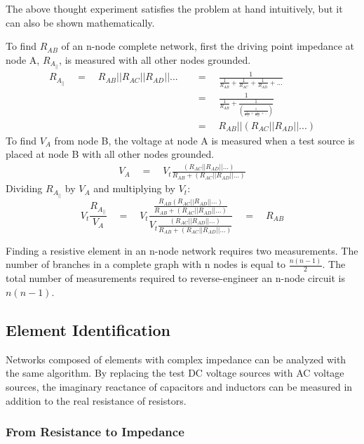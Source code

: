 The above thought experiment satisfies the problem at hand intuitively, but it can also be shown mathematically.

To find $R_{AB}$ of an n-node complete network, first the driving point impedance at node A, $R_{A_{||}}$, is measured with all other nodes grounded.
\begin{align*}
R_{A_{||}} 
\quad = \quad R_{AB}||R_{AC}||R_{AD}||... 
\quad &= \quad \frac{1}{\frac{1}{R_{AB}}+\frac{1}{R_{AC}}+\frac{1}{R_{AD}}+...}\\
\quad &= \quad \frac{1}{\frac{1}{R_{AB}}+\frac{1}
{(\frac{1}{\frac{1}{R_{AC}}+\frac{1}{R_{AD}}+...})}}\\
\quad &= \quad R_{AB}||(R_{AC}||R_{AD}||...)
\end{align*}
To find $V_A$ from node B, the voltage at node A is measured when a test source is placed at node B with all other nodes grounded.
\begin{align*}
V_A
\quad = \quad V_t \frac{(R_{AC}||R_{AD}||...)}{R_{AB}+(R_{AC}||R_{AD}||...)}
\end{align*}
Dividing $R_{A_{||}}$ by $V_A$ and multiplying by $V_t$:
\begin{equation*}
V_t \frac{R_{A_{||}}}{V_A}
\quad = \quad V_t \frac{\frac{R_{AB}(R_{AC}||R_{AD}||...)}{R_{AB}+(R_{AC}||R_{AD}||...)}}
	{V_t \frac{(R_{AC}||R_{AD}||...)}{R_{AB}+(R_{AC}||R_{AD}||...)}}
\quad = \quad R_{AB} 
\end{equation*}

Finding a resistive element in an n-node network requires two measurements. 
The number of branches in a complete graph with n nodes is equal to $\frac{n(n-1)}{2}$.
The total number of measurements required to reverse-engineer an n-node circuit is $n(n-1)$.


\subsection{Element Identification}

Networks composed of elements with complex impedance can be analyzed with the same algorithm.
By replacing the test DC voltage sources with AC voltage sources, the imaginary reactance of capacitors and inductors can be measured in addition to the real resistance of resistors.

\subsubsection{From Resistance to Impedance}

